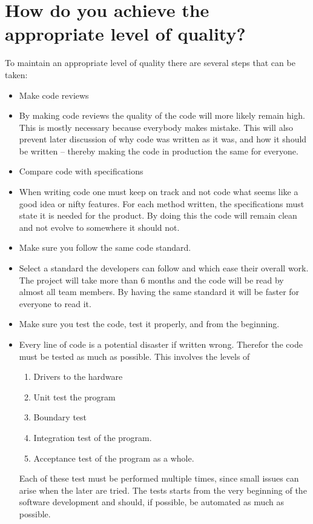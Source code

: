 \documentclass[Main]{subfiles}
\begin{document}
\vspace{-5mm}
\section{How do you achieve the appropriate level of quality?}

To maintain an appropriate level of quality there are several steps that can be taken:

\vspace{-5mm}
\begin{itemize}
	\item Make code reviews
	\item[] By making code reviews the quality of the code will more likely remain high.
	This is mostly necessary because everybody makes mistake.
	This will also prevent later discussion of why code was written as it was, and how it should be written -- thereby making the code in production the same for everyone.

	\item Compare code with specifications
	\item[] When writing code one must keep on track and not code what seems like a good idea or nifty features.
	For each method written, the specifications must state it is needed for the product.
	By doing this the code will remain clean and not evolve to somewhere it should not.


	\item Make sure you follow the same code standard.
	\item[] Select a standard the developers can follow and which ease their overall work. 
	The project will take more than 6 months and the code will be read by almost all team members.
	By having the same standard it will be faster for everyone to read it.

	\item Make sure you test the code, test it properly, and from the beginning.
	\item[] Every line of code is a potential disaster if written wrong.
	Therefor the code must be tested as much as possible. 
	This involves the levels of
	\begin{enumerate}
		\item Drivers to the hardware
		\item Unit test the program
		\item Boundary test
		\item Integration test of the program.
		\item Acceptance test of the program as a whole.
	\end{enumerate}
	Each of these test must be performed multiple times, since small issues can arise when the later are tried.
	The tests starts from the very beginning of the software development and should, if possible, be automated as much as possible.


\end{itemize}
\end{document}
